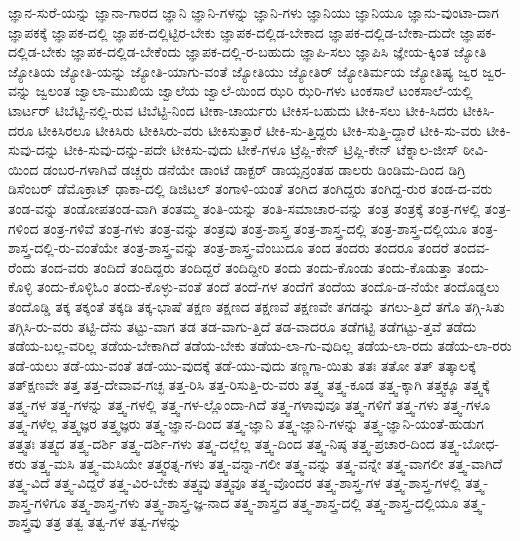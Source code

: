 {ಜ್ಞಾನ-ಸುರೆ-ಯನ್ನು
ಜ್ಞಾನಾ-ಗಾರದ
ಜ್ಞಾನಿ
ಜ್ಞಾನಿ-ಗಳನ್ನು
ಜ್ಞಾನಿ-ಗಳು
ಜ್ಞಾನಿಯು
ಜ್ಞಾನಿಯೂ
ಜ್ಞಾನು-ವುಂಟಾ-ದಾಗ
ಜ್ಞಾಪಕಕ್ಕೆ
ಜ್ಞಾಪಕ-ದಲ್ಲಿ
ಜ್ಞಾಪಕ-ದಲ್ಲಿಟ್ಟಿರ-ಬೇಕು
ಜ್ಞಾಪಕ-ದಲ್ಲಿಡ-ಬೇಕಾದ
ಜ್ಞಾಪಕ-ದಲ್ಲಿಡ-ಬೇಕಾ-ದುದೇ
ಜ್ಞಾಪಕ-ದಲ್ಲಿಡ-ಬೇಕು
ಜ್ಞಾಪಕ-ದಲ್ಲಿಡ-ಬೇಕೆಂದು
ಜ್ಞಾಪಕ-ದಲ್ಲಿ-ರ-ಬಹುದು
ಜ್ಞಾಪಿ-ಸಲು
ಜ್ಞಾಪಿಸಿ
ಜ್ಞೇಯ-ಕ್ಕಿಂತ
ಜ್ಯೋತಿ
ಜ್ಯೋತಿಯ
ಜ್ಯೋತಿ-ಯನ್ನು
ಜ್ಯೋತಿ-ಯಾಗು-ವಂತೆ
ಜ್ಯೋತಿಯು
ಜ್ಯೋತಿರ್
ಜ್ಯೋತಿರ್ಮಯ
ಜ್ಯೋತಿಷ್ಯ
ಜ್ವರ
ಜ್ವರ-ವನ್ನು
ಜ್ವಲಂತ
ಜ್ವಾಲಾ-ಮುಖಿಯ
ಜ್ವಾಲೆಯ
ಜ್ವಾಲೆ-ಯಿಂದ
ಝರಿ
ಝರಿ-ಗಳು
ಟಂಕಸಾಲೆ
ಟಂಕಸಾಲೆ-ಯಲ್ಲಿ
ಟಾರ್ಟರ್
ಟಿಬೆಟ್ಟಿ-ನಲ್ಲಿ-ರುವ
ಟಿಬೆಟ್ಟಿ-ನಿಂದ
ಟೀಕಾ-ಚಾರ್ಯರು
ಟೀಕಿಸ-ಬಹುದು
ಟೀಕಿ-ಸಲು
ಟೀಕಿ-ಸಿದರು
ಟೀಕಿಸಿ-ದರೂ
ಟೀಕಿಸಿರಲೂ
ಟೀಕಿಸಿರು
ಟೀಕಿಸಿರು-ವರು
ಟೀಕಿಸುತ್ತಾರೆ
ಟೀಕಿ-ಸು-ತ್ತಿದ್ದರು
ಟೀಕಿ-ಸುತ್ತಿ-ದ್ದಾರೆ
ಟೀಕಿ-ಸು-ವರು
ಟೀಕಿ-ಸುವು-ದನ್ನು
ಟೀಕಿ-ಸುವು-ದನ್ನು-ಪದೇ
ಟೀಕಿಸು-ವುದು
ಟೀಕೆ-ಗಳೂ
ಟ್ರೆಪ್ಲಿ-ಕೇನ್
ಟ್ರಿಪ್ಲಿ-ಕೇನ್
ಟೆಕ್ನಾಲ-ಜೀಸ್
ಠೀವಿ-ಯಿಂದ
ಡಂಬರ-ಗಳಾಗಿವೆ
ಡಚ್ಚರು
ಡನೆಯೇ
ಡಾಂಟೆ
ಡಾಕ್ಟರ್
ಡಾಯ್ಸನ್ರಂತಹ
ಡಾಲರು
ಡಿಂಡಿಮ-ದಿಂದ
ಡಿಗ್ರಿ
ಡಿಸೆಂಬರ್
ಡೆಮೊಕ್ರಾಟ್
ಢಾಕಾ-ದಲ್ಲಿ
ಡಿಜಿಟಲ್
ತಂಗಾಳಿ-ಯಂತೆ
ತಂಗಿದ
ತಂಗಿದ್ದರು
ತಂಗಿದ್ದ-ರುರ
ತಂಡ-ದ-ವರು
ತಂಡ-ವನ್ನು
ತಂಡೋಪತಂಡ-ವಾಗಿ
ತಂತಮ್ಮ
ತಂತಿ-ಯನ್ನು
ತಂತಿ-ಸಮಾಚಾರ-ವನ್ನು
ತಂತ್ರ
ತಂತ್ರಕ್ಕೆ
ತಂತ್ರ-ಗಳಲ್ಲಿ
ತಂತ್ರ-ಗಳಿಂದ
ತಂತ್ರ-ಗಳಿವೆ
ತಂತ್ರ-ಗಳು
ತಂತ್ರ-ವನ್ನು
ತಂತ್ರವು
ತಂತ್ರ-ಶಾಸ್ತ್ರ
ತಂತ್ರ-ಶಾಸ್ತ್ರ-ದಲ್ಲಿ
ತಂತ್ರ-ಶಾಸ್ತ್ರ-ದಲ್ಲಿಯೂ
ತಂತ್ರ-ಶಾಸ್ತ್ರ-ದಲ್ಲಿ-ರು-ವಂತೆಯೇ
ತಂತ್ರ-ಶಾಸ್ತ್ರ-ವನ್ನು
ತಂತ್ರ-ಶಾಸ್ತ್ರ-ವೆಂಬುದೂ
ತಂದ
ತಂದರು
ತಂದರೂ
ತಂದರೆ
ತಂದವ-ರೆಂದು
ತಂದ-ವರು
ತಂದಿದೆ
ತಂದಿದ್ದರು
ತಂದಿದ್ದರೆ
ತಂದಿದ್ದೀರಿ
ತಂದು
ತಂದು-ಕೊಂಡು
ತಂದು-ಕೊಡುತ್ತಾ
ತಂದು-ಕೊಳ್ಳಿ
ತಂದು-ಕೊಳ್ಳಿಓಂ
ತಂದು-ಕೊಳ್ಳು-ವಂತೆ
ತಂದೆ
ತಂದೆ-ಗಳ
ತಂದೆಗೆ
ತಂದೆಯ
ತಂದೊ-ಡ-ನೆಯೇ
ತಂದೊಡ್ಡಲು
ತಂದೊಡ್ಡಿ
ತಕ್ಕ
ತಕ್ಕಂತೆ
ತಕ್ಕಡಿ
ತಕ್ಕ-ಭಾಷೆ
ತಕ್ಷಣ
ತಕ್ಷಣದ
ತಕ್ಷಣವೆ
ತಕ್ಷಣವೇ
ತಗಡನ್ನು
ತಗಲು-ತ್ತಿದೆ
ತಗೊ
ತಗ್ಗಿ-ಸಿತು
ತಗ್ಗಿಸಿ-ರು-ವರು
ತಟ್ಟಿ-ದೆನು
ತಟ್ಟು-ವಾಗ
ತಡ
ತಡ-ವಾಗು-ತ್ತಿದೆ
ತಡ-ವಾದರೂ
ತಡೆಗಟ್ಟಿ
ತಡೆಗಟ್ಟು-ತ್ತವೆ
ತಡೆದು
ತಡೆಯ-ಬಲ್ಲ-ವರಿಲ್ಲ
ತಡೆಯ-ಬೇಕಾಗಿದೆ
ತಡೆಯ-ಬೇಕು
ತಡೆಯ-ಲಾ-ಗು-ವುದಿಲ್ಲ
ತಡೆಯ-ಲಾ-ರದು
ತಡೆಯ-ಲಾ-ರರು
ತಡೆ-ಯಲು
ತಡೆ-ಯು-ವಂತೆ
ತಡೆ-ಯು-ವುದಕ್ಕೆ
ತಡೆ-ಯು-ವುದು
ತಣ್ಣಗಾ-ಯಿತು
ತತಃ
ತತೋ
ತತ್
ತತ್ಕಾಲಕ್ಕೆ
ತತ್ಕ್ಷಣವೇ
ತತ್ತ
ತತ್ತ-ದೇವಾವ-ಗಚ್ಛ
ತತ್ತ-ರಿಸಿ
ತತ್ತ-ರಿಸುತ್ತಿ-ರು-ವರು
ತತ್ತ್ವ
ತತ್ತ್ವ-ಕೂಡ
ತತ್ತ್ವ-ಕ್ಕಾಗಿ
ತತ್ತ್ವಕ್ಕೂ
ತತ್ತ್ವಕ್ಕೆ
ತತ್ತ್ವ-ಗಳ
ತತ್ತ್ವ-ಗಳನ್ನು
ತತ್ತ್ವ-ಗಳಲ್ಲಿ
ತತ್ತ್ವ-ಗಳ-ಲ್ಲೊಂದಾ-ಗಿದೆ
ತತ್ತ್ವ-ಗಳಾವುವೂ
ತತ್ತ್ವ-ಗಳಿಗೆ
ತತ್ತ್ವ-ಗಳು
ತತ್ತ್ವ-ಗಳೂ
ತತ್ತ್ವ-ಗಳೆಲ್ಲ
ತತ್ತ್ವಜ್ಞರ
ತತ್ತ್ವಜ್ಞರು
ತತ್ತ್ವ-ಜ್ಞಾನ-ದಿಂದ
ತತ್ತ್ವ-ಜ್ಞಾನಿ
ತತ್ತ್ವ-ಜ್ಞಾನಿ-ಗಳನ್ನು
ತತ್ತ್ವ-ಜ್ಞಾನಿ-ಯಂತೆ-ಹುಡುಗ
ತತ್ತ್ವತಃ
ತತ್ತ್ವದ
ತತ್ತ್ವ-ದರ್ಶಿ
ತತ್ತ್ವ-ದರ್ಶಿ-ಗಳು
ತತ್ತ್ವ-ದಲ್ಲೆಲ್ಲ
ತತ್ತ್ವ-ದಿಂದ
ತತ್ತ್ವ-ನಿಷ್ಠ
ತತ್ತ್ವ-ಪ್ರಚಾರ-ದಿಂದ
ತತ್ತ್ವ-ಬೋಧ-ಕರು
ತತ್ತ್ವ-ಮಸಿ
ತತ್ತ್ವ-ಮಸಿಯೇ
ತತ್ತ್ವರತ್ನ-ಗಳು
ತತ್ತ್ವ-ವನ್ನಾ-ಗಲೀ
ತತ್ತ್ವ-ವನ್ನು
ತತ್ತ್ವ-ವನ್ನೇ
ತತ್ತ್ವ-ವಾಗಲೀ
ತತ್ತ್ವ-ವಾಗಿದೆ
ತತ್ತ್ವ-ವಿದೆ
ತತ್ತ್ವ-ವಿದ್ದರೆ
ತತ್ತ್ವ-ವಿರ-ಬೇಕು
ತತ್ತ್ವವು
ತತ್ತ್ವವೂ
ತತ್ತ್ವ-ವೊಂದರ
ತತ್ತ್ವ-ಶಾಸ್ತ್ರ-ಗಳ
ತತ್ತ್ವ-ಶಾಸ್ತ್ರ-ಗಳಲ್ಲಿ
ತತ್ತ್ವ-ಶಾಸ್ತ್ರ-ಗಳಿಗೂ
ತತ್ತ್ವ-ಶಾಸ್ತ್ರ-ಗಳು
ತತ್ತ್ವ-ಶಾಸ್ತ್ರ-ಜ್ಞ-ನಾದ
ತತ್ತ್ವ-ಶಾಸ್ತ್ರದ
ತತ್ತ್ವ-ಶಾಸ್ತ್ರ-ದಲ್ಲಿ
ತತ್ತ್ವ-ಶಾಸ್ತ್ರ-ದಲ್ಲಿಯೂ
ತತ್ತ್ವ-ಶಾಸ್ತ್ರವು
ತತ್ರ
ತತ್ವ
ತತ್ವ-ಗಳ
ತತ್ವ-ಗಳನ್ನು
}
